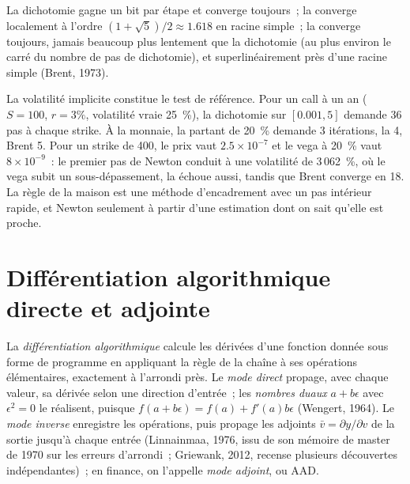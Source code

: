 \begin{proposition}\label{prop:qm:transforms-interpolation-and-algorithmic-differentiation:rootconv}
La dichotomie gagne un bit par étape et converge toujours~; la  converge localement à l'ordre $(1 + \sqrt5)/2 \approx 1.618$ en racine simple~; la  converge toujours, jamais beaucoup plus lentement que la dichotomie
(au plus environ le carré du nombre de pas de dichotomie), et superlinéairement près d'une racine simple (Brent, 1973).
\end{proposition}

La volatilité implicite constitue le test de référence. Pour un call à un an ($S = 100$, $r = 3\%$, volatilité vraie 25~\%), la dichotomie sur $[0.001, 5]$ demande 36 pas à chaque strike. À la monnaie, la  partant de 20~\% demande 3
itérations, la  4, Brent 5. Pour un strike de 400, le prix vaut $2.5 \times 10^{-7}$ et le vega à 20~\% vaut $8 \times 10^{-9}$~: le premier pas de Newton conduit à une volatilité de 3\,062~\%, où le vega
subit un sous-dépassement, la  échoue aussi, tandis que Brent converge en 18. La règle de la maison est une méthode d'encadrement avec un pas intérieur rapide, et Newton seulement à partir d'une estimation dont on sait qu'elle est proche.

\section{Différentiation algorithmique directe et adjointe}

\begin{definition}\label{def:qm:transforms-interpolation-and-algorithmic-differentiation:ad}
La \emph{différentiation algorithmique} calcule les dérivées d'une fonction donnée sous forme de programme en appliquant la règle de la chaîne à ses opérations élémentaires, exactement à
l'arrondi près. Le \emph{mode direct} propage, avec chaque valeur, sa dérivée selon une direction d'entrée~; les \emph{nombres duaux} $a + b\epsilon$ avec $\epsilon^2 = 0$ le réalisent,
puisque $f(a + b\epsilon) = f(a) + f'(a)b\epsilon$ (Wengert, 1964). Le \emph{mode inverse} enregistre les opérations, puis propage les adjoints $\bar v = \partial y/\partial v$ de la sortie jusqu'à
chaque entrée (Linnainmaa, 1976, issu de son mémoire de master de 1970 sur les erreurs d'arrondi~; Griewank, 2012, recense plusieurs découvertes indépendantes)~; en finance, on l'appelle \emph{mode adjoint}, ou AAD.
\end{definition}

